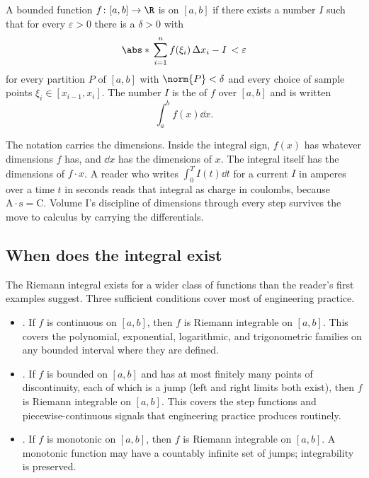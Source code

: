 \begin{definition}
A bounded function $f \colon [a,b] \to \R$ is  on $[a,b]$ if there exists a number $I$ such that for
every $\varepsilon > 0$ there is a $\delta > 0$ with
\[
\abs*{\,\sum_{i=1}^{n} f(\xi_{i})\,\Delta x_{i} - I\,} < \varepsilon
\]
for every partition $P$ of $[a,b]$ with $\norm{P} < \delta$ and
every choice of sample points $\xi_{i} \in [x_{i-1}, x_{i}]$. The
number $I$ is the  of $f$ over $[a,b]$
and is written
\[
\int_{a}^{b} f(x) \dd x.
\]
\end{definition}

The notation carries the dimensions. Inside the integral sign, $f(x)$
has whatever dimensions $f$ has, and $\dd x$ has the dimensions of
$x$. The integral itself has the dimensions of $f \cdot x$. A reader
who writes $\int_{0}^{T} I(t) \dd t$ for a current $I$ in amperes
over a time $t$ in seconds reads that integral as charge in coulombs,
because $\si{\ampere} \cdot \si{\second} = \si{\coulomb}$. Volume I's
discipline of dimensions through every step survives the move to
calculus by carrying the differentials.

\subsection{When does the integral exist}

The Riemann integral exists for a wider class of functions than the
reader's first examples suggest. Three sufficient conditions cover
most of engineering practice.

\begin{itemize}[leftmargin=*]
  \item {}. If $f$ is
    continuous on $[a,b]$, then $f$ is Riemann integrable on
    $[a,b]$. This covers the polynomial, exponential, logarithmic,
    and trigonometric families on any bounded interval where they
    are defined.
  \item {}. If $f$ is bounded
    on $[a,b]$ and has at most finitely many points of discontinuity,
    each of which is a jump (left and right limits both exist), then
    $f$ is Riemann integrable on $[a,b]$. This covers the step
    functions and piecewise-continuous signals that engineering
    practice produces routinely.
  \item {}. If $f$ is monotonic on $[a,b]$, then
    $f$ is Riemann integrable on $[a,b]$. A monotonic function may
    have a countably infinite set of jumps; integrability is
    preserved.
\end{itemize}

